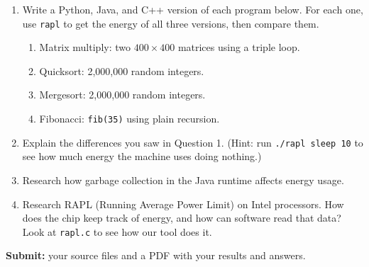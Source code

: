 \documentclass[11pt]{article}
\begin{document}
\begin{enumerate}[label=\textbf{\arabic*.}, leftmargin=*, itemsep=10pt]

\item Write a Python, Java, and C++ version of each program below. For each one, use
  \texttt{rapl} to get the energy of all three versions, then compare them.

  \begin{enumerate}[label=\textbf{\alph*.}, itemsep=4pt]
    \item Matrix multiply: two $400 \times 400$ matrices using a triple loop.
    \item Quicksort: 2,000,000 random integers.
    \item Mergesort: 2,000,000 random integers.
    \item Fibonacci: \texttt{fib(35)} using plain recursion.
  \end{enumerate}

\item Explain the differences you saw in Question 1. (Hint: run
  \texttt{./rapl sleep 10} to see how much energy the machine uses doing nothing.)

\item Research how garbage collection in the Java runtime affects energy usage.

\item Research RAPL (Running Average Power Limit) on Intel processors. How does the chip
  keep track of energy, and how can software read that data? Look at \texttt{rapl.c} to
  see how our tool does it.

\end{enumerate}

\textbf{Submit:} your source files and a PDF with your results and answers.
\end{document}
